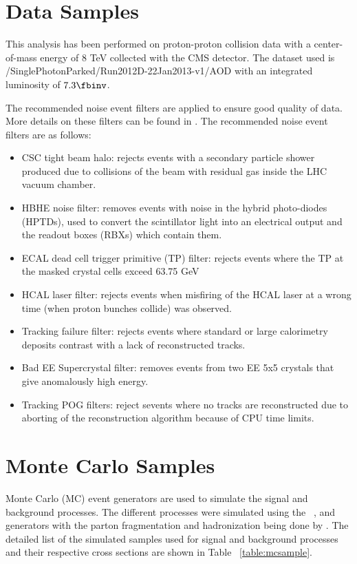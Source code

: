 \section{Data Samples}
\label{sec:data}

This analysis has been performed on proton-proton collision data with a center-of-mass energy of 8 TeV collected with the CMS detector. The dataset used is /SinglePhotonParked/Run2012D-22Jan2013-v1/AOD with an integrated luminosity of $7.3 \fbinv$.

The recommended noise event filters are applied to ensure good quality of data. More details on these filters can be found in \cite{CMS_AN_2012-268}. The recommended noise event filters are as follows:

\begin{itemize}
\item CSC tight beam halo: rejects events with a secondary particle shower produced due to collisions of the beam with residual gas inside the LHC vacuum chamber.
\item HBHE noise filter: removes events with noise in the hybrid photo-diodes (HPTDs), used to convert the scintillator light into an electrical output and the readout boxes (RBXs) which contain them.
\item ECAL dead cell trigger primitive (TP) filter: rejects events where the TP \et at the masked crystal cells exceed 63.75 GeV
\item HCAL laser filter: rejects events when misfiring of the HCAL laser at a wrong time (when proton bunches collide) was observed. 
\item Tracking failure filter: rejects events where standard or large calorimetry deposits contrast with a lack of reconstructed tracks.
\item Bad EE Supercrystal filter: removes events from two EE 5x5 crystals that give anomalously high energy.
\item Tracking POG filters: reject sevents where no tracks are reconstructed due to aborting of the reconstruction algorithm because of CPU time limits.
\end{itemize}

\section{Monte Carlo Samples}
\label{sec:mc}

Monte Carlo (MC) event generators are used to simulate the signal and background processes. The different processes were simulated using the \MADGRAPH~\cite{madgraph}, and \PYTHIA~\cite{pythia} generators with the parton fragmentation and hadronization being done by \PYTHIA. The detailed list of the simulated samples used for signal and background processes and their respective cross sections are shown in Table ~\ref{table:mcsample}. 

